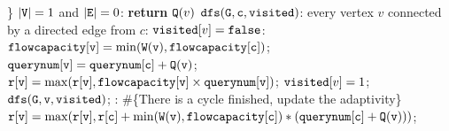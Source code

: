 \begin{algorithm}
\begin{algorithmic}[1]
             \}
              $|\mathtt{V}| = 1$ and $|\mathtt{E}| = 0$: {\bf return}  $\mathtt{Q}(v)$
              {$\mathtt{dfs(G, c,visited)}$}:
             \STATE {} every vertex $v$ 
             connected by a directed edge from $c$:
             \STATE \qquad {} $\mathtt{visited}[v] = \mathtt{false}$:
             \STATE \qquad \qquad \quad $\mathtt{flowcapacity[v] = \min(\mathtt{W}(v), {flowcapacity}[c])}$;
             \STATE \qquad \qquad \quad $\mathtt{querynum[v] = querynum[c] + \mathtt{Q}(v)}$;
             \STATE \qquad \qquad \quad $\mathtt{r[v] =  \max(r[v], flowcapacity[v] \times querynum[v]}) $; 
             \STATE \qquad \qquad \quad  $\mathtt{visited}[v] = 1$;
             $\mathtt{dfs(G, v, visited)}$; %
             \STATE \qquad {}: \#\{There is a cycle finished, update the adaptivity\}
             \STATE \qquad \qquad \quad 
             $\mathtt{r[v] =  \max(r[v], r[c] +  \min(\mathtt{W}(v), {flowcapacity}[c]) * (querynum[c] + \mathtt{Q}(v)))}$;

\end{algorithmic}
\end{algorithm}
